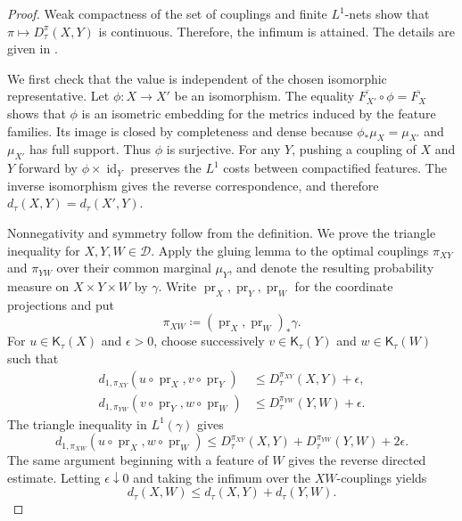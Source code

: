 \documentclass[10pt,a4paper]{amsart}
\newcommand{\D}{\mathcal D}
\newcommand{\Kc}{\mathsf K}
\newcommand{\dtau}{d_{\tau}}
\DeclareMathOperator{\pr}{pr}
\begin{document}
\begin{proof}
Weak compactness of the set of couplings \cite[Lemma~2.10]{gds1} and finite $L^1$-nets show that $\pi\mapsto D_\tau^\pi(X,Y)$ is continuous. Therefore, the infimum is attained. The details are given in .

We first check that the value is independent of the chosen isomorphic representative. Let $\phi\colon X\to X'$ be an isomorphism. The equality $\overline{F_{X'}}\circ\phi=\overline{F_X}$ shows that $\phi$ is an isometric embedding for the metrics induced by the feature families. Its image is closed by completeness and dense because $\phi_*\mu_X=\mu_{X'}$ and $\mu_{X'}$ has full support. Thus $\phi$ is surjective. For any $Y$, pushing a coupling of $X$ and $Y$ forward by $\phi\times\operatorname{id}_Y$ preserves the $L^1$ costs between compactified features. The inverse isomorphism gives the reverse correspondence, and therefore $\dtau(X,Y)=\dtau(X',Y)$.

Nonnegativity and symmetry follow from the definition. We prove the triangle inequality for $X,Y,W\in\D$. Apply the gluing lemma \cite[Lemma~7.6]{villani2009optimal} to the optimal couplings $\pi_{XY}$ and $\pi_{YW}$ over their common marginal $\mu_Y$, and denote the resulting probability measure on $X\times Y\times W$ by $\gamma$. Write $\pr_X,\pr_Y,\pr_W$ for the coordinate projections and put
\[
\pi_{XW}\coloneqq(\pr_X,\pr_W)_*\gamma.
\]
For $u\in\Kc_\tau(X)$ and $\epsilon>0$, choose successively $v\in\Kc_\tau(Y)$ and $w\in\Kc_\tau(W)$ such that
\[
\begin{aligned}
d_{1,\pi_{XY}}(u\circ\pr_X,v\circ\pr_Y)
&\leq D_\tau^{\pi_{XY}}(X,Y)+\epsilon,\\
d_{1,\pi_{YW}}(v\circ\pr_Y,w\circ\pr_W)
&\leq D_\tau^{\pi_{YW}}(Y,W)+\epsilon.
\end{aligned}
\]
The triangle inequality in $L^1(\gamma)$ gives
\[
d_{1,\pi_{XW}}(u\circ\pr_X,w\circ\pr_W)
\leq D_\tau^{\pi_{XY}}(X,Y)+D_\tau^{\pi_{YW}}(Y,W)+2\epsilon.
\]
The same argument beginning with a feature of $W$ gives the reverse directed estimate. Letting $\epsilon\downarrow0$ and taking the infimum over the $XW$-couplings yields
\[
\dtau(X,W)\leq\dtau(X,Y)+\dtau(Y,W).
\]


\end{proof}
\end{document}
